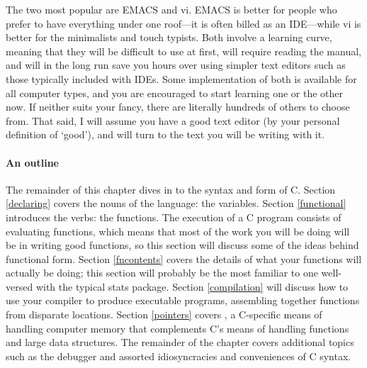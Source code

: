 \documentclass[12pt]{article}
\def\ind#1{\index{#1}#1}
\begin{document}
The two most popular are \ind{EMACS} and \ind{vi}. EMACS is better for
people who prefer to have everything under one roof---it is often billed
as an IDE---while vi is better for the minimalists and touch typists. Both
involve a learning curve, meaning that they will be difficult to use at
first, will require reading the manual, and will in the long run save
you hours over using simpler text editors such as those typically
included with IDEs. Some implementation of both is available for all
computer types, and you are encouraged to start learning one or the other
now. If neither suits your fancy, there are literally hundreds of others
to choose from. That said, I will assume you have a good text editor
(by your personal definition of `good'), and will turn to the text you
will be writing with it.
\ifbook \else 
	
\fi
\paragraph{An outline} The remainder of this chapter dives in to the
syntax and form of C. Section \ref{declaring} covers the nouns of the
language: the variables. Section \ref{functional} introduces the verbs:
the functions. The execution of a C program consists of evaluating
functions, which means that most of the work you will be doing will be
in writing good functions, so this section will discuss some of the
ideas behind functional form. Section \ref{fncontents} covers 
the details of what your functions will actually be doing; this section
will probably be the most familiar to one well-versed with the typical
stats package. Section \ref{compilation} will discuss how to use your
compiler to produce executable programs, assembling together functions
from disparate locations. Section \ref{pointers} covers ,
a C-specific means of handling computer memory that complements C's
means of handling functions and large data structures. The remainder of
the chapter covers additional topics such as the debugger and assorted
idiosyncracies and conveniences of C syntax.
\end{document}

